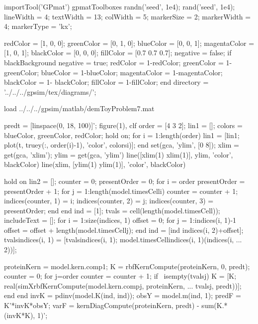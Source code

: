 \begin{octave}
  importTool('GPmat')
  gpmatToolboxes
  randn('seed', 1e4);
  rand('seed', 1e4);
  lineWidth = 4;
  textWidth = 13;
  colWidth = 5;
  markerSize = 2;
  markerWidth = 4;
  markerType = 'kx';
  
  redColor = [1, 0, 0];
  greenColor = [0, 1, 0];
  blueColor = [0, 0, 1];
  magentaColor = [1, 0, 1];
  blackColor = [0, 0, 0];
  fillColor = [0.7 0.7 0.7];
  negative = false;
  if blackBackground
    negative = true;
    redColor = 1-redColor;
    greenColor = 1-greenColor;
    blueColor =  1-blueColor;
    magentaColor = 1-magentaColor;
    blackColor = 1- blackColor;
    fillColor = 1-fillColor;
  end
  directory = '../../../gpsim/tex/diagrams/';
\end{octave}

\begin{frame}
\begin{octave}
load ../../../gpsim/matlab/demToyProblem7.mat

predt = [linspace(0, 18, 100)]';
figure(1), clf
order = [4 3 2];
lin1 = [];
colors = {blueColor, greenColor, redColor};
hold on;
for i = 1:length(order)
  lin1 = [lin1; plot(t, truey(:, order(i)-1), 'color', colors{i})];
end
set(gca, 'ylim', [0 8]);
xlim = get(gca, 'xlim');
ylim = get(gca, 'ylim')
line([xlim(1) xlim(1)], ylim, 'color', blackColor)
line(xlim, [ylim(1) ylim(1)], 'color', blackColor)

hold on
lin2 = [];
counter = 0;
presentOrder = 0;
for i = order
  presentOrder = presentOrder + 1;
  for j = 1:length(model.timesCell{i})
    counter = counter + 1;
    indices(counter, 1) = i;
    indices(counter, 2) = j;
    indices(counter, 3) = presentOrder;
  end
end
ind = [1];
tvals = cell(length(model.timesCell));
includeText = [];
for i = 1:size(indices, 1)
  offset = 0;
  for j = 1:indices(i, 1)-1
    offset = offset + length(model.timesCell{j});
  end
  ind = [ind indices(i, 2)+offset];
  tvals{indices(i, 1)} = [tvals{indices(i, 1)}; model.timesCell{indices(i, 1)}(indices(i, ...
                                                    2))];
  
  proteinKern = model.kern.comp{1};
  K = rbfKernCompute(proteinKern, 0, predt);
  counter = 0;
  for j=order
    counter = counter + 1;
    if ~isempty(tvals{j})
      K = [K; real(simXrbfKernCompute(model.kern.comp{j}, proteinKern, ...
                                      tvals{j}, predt))];
    end
  end  
  invK = pdinv(model.K(ind, ind));
  obsY = model.m(ind, 1);
  predF = K'*invK*obsY;
  varF = kernDiagCompute(proteinKern, predt) - sum(K.*(invK*K), 1)';
  

\end{octave}
\end{frame}
